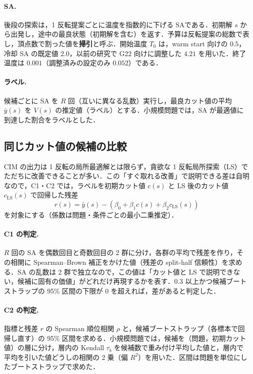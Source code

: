 \paragraph{SA.} 後段の探索は，1 反転提案ごとに温度を指数的に下げる SA\cite{kirkpatrick1983}である．初期解 $s$ から出発し，途中の最良状態（初期解を含む）を返す．予算は反転提案の総数で表し，頂点数で割った値を\textbf{掃引}と呼ぶ．開始温度 $T_0$ は，warm start 向けの $0.5$，冷却 SA の既定値 $2.0$，以前の研究で G22 向けに調整した $4.21$ を用いた．終了温度は $0.001$（調整済みの設定のみ $0.052$）である．

\paragraph{ラベル.} 候補ごとに SA を $R$ 回（互いに異なる乱数）実行し，最良カット値の平均 $\bar{y}(s)$ を $V(s)$ の推定値（ラベル）とする．小規模問題では，SA が最適値に到達した割合をラベルとした．

\subsection{同じカット値の候補の比較}

CIM の出力は 1 反転の局所最適解とは限らず，貪欲な 1 反転局所探索（LS）でただちに改善できることが多い．この「すぐ取れる改善」で説明できる差は自明なので，C1・C2 では，ラベルを初期カット値 $c(s)$ と LS 後のカット値 $c_{\mathrm{LS}}(s)$ で回帰した残差
\begin{equation}
  r(s) = \bar{y}(s) - \left(\beta_0 + \beta_1 c(s) + \beta_2 c_{\mathrm{LS}}(s)\right)
\end{equation}
を対象にする（係数は問題・条件ごとの最小二乗推定）．

\paragraph{C1 の判定.} $R$ 回の SA を偶数回目と奇数回目の 2 群に分け，各群の平均で残差を作り，その相関に Spearman--Brown 補正をかけた値（残差の split-half 信頼性）を求める．SA の乱数は 2 群で独立なので，この値は「カット値と LS で説明できない，候補に固有の価値」がどれだけ再現するかを表す．0.3 以上かつ候補ブートストラップの 95\% 区間の下限が 0 を超えれば，差があると判定した．

\paragraph{C2 の判定.} 指標と残差 $r$ の Spearman 順位相関 $\rho$ と，候補ブートストラップ（各標本で回帰し直す）の 95\% 区間を求める．小規模問題では，候補を（問題，初期カット値）の層に分け，層内の Kendall $\tau_b$ を候補数で重み付け平均した値と，層内で平均を引いた値どうしの相関の 2 乗（偏 $R^2$）を用いた．区間は問題を単位にしたブートストラップで求めた．

